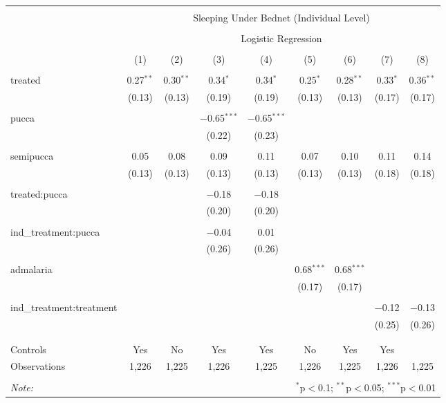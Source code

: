 
\begin{table}[!htbp] \centering 
  \caption{} 
  \label{} 
\small 
\begin{tabular}{@{\extracolsep{5pt}}lcccccccc} 
\\[-1.8ex]\hline 
\hline \\[-1.8ex] 
 & \multicolumn{8}{c}{Sleeping Under Bednet (Individual Level)} \\ 
\cline{2-9} 
\\[-1.8ex] & \multicolumn{8}{c}{Logistic Regression} \\ 
\\[-1.8ex] & (1) & (2) & (3) & (4) & (5) & (6) & (7) & (8)\\ 
\hline \\[-1.8ex] 
 treated & 0.27$^{**}$ & 0.30$^{**}$ & 0.34$^{*}$ & 0.34$^{*}$ & 0.25$^{*}$ & 0.28$^{**}$ & 0.33$^{*}$ & 0.36$^{**}$ \\ 
  & (0.13) & (0.13) & (0.19) & (0.19) & (0.13) & (0.13) & (0.17) & (0.17) \\ 
  & & & & & & & & \\ 
 pucca &  &  & $-$0.65$^{***}$ & $-$0.65$^{***}$ &  &  &  &  \\ 
  &  &  & (0.22) & (0.23) &  &  &  &  \\ 
  & & & & & & & & \\ 
 semipucca & 0.05 & 0.08 & 0.09 & 0.11 & 0.07 & 0.10 & 0.11 & 0.14 \\ 
  & (0.13) & (0.13) & (0.13) & (0.13) & (0.13) & (0.13) & (0.18) & (0.18) \\ 
  & & & & & & & & \\ 
 treated:pucca &  &  & $-$0.18 & $-$0.18 &  &  &  &  \\ 
  &  &  & (0.20) & (0.20) &  &  &  &  \\ 
  & & & & & & & & \\ 
 ind\_treatment:pucca &  &  & $-$0.04 & 0.01 &  &  &  &  \\ 
  &  &  & (0.26) & (0.26) &  &  &  &  \\ 
  & & & & & & & & \\ 
 admalaria &  &  &  &  & 0.68$^{***}$ & 0.68$^{***}$ &  &  \\ 
  &  &  &  &  & (0.17) & (0.17) &  &  \\ 
  & & & & & & & & \\ 
 ind\_treatment:treatment &  &  &  &  &  &  & $-$0.12 & $-$0.13 \\ 
  &  &  &  &  &  &  & (0.25) & (0.26) \\ 
  & & & & & & & & \\ 
\hline \\[-1.8ex] 
Controls & Yes & No & Yes & Yes & No & Yes & Yes &  \\ 
Observations & 1,226 & 1,225 & 1,226 & 1,225 & 1,226 & 1,225 & 1,226 & 1,225 \\ 
\hline 
\hline \\[-1.8ex] 
\textit{Note:}  & \multicolumn{8}{r}{$^{*}$p$<$0.1; $^{**}$p$<$0.05; $^{***}$p$<$0.01} \\ 
\end{tabular} 
\end{table} 
